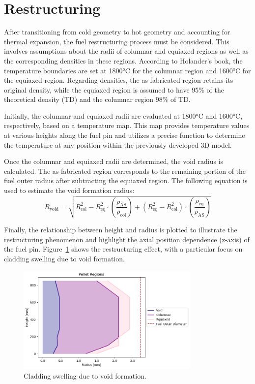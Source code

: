\section{Restructuring}
After transitioning from cold geometry to hot geometry and accounting for thermal expansion, the fuel restructuring process must be considered. This involves assumptions about the radii of columnar and equiaxed regions as well as the corresponding densities in these regions. According to Holander’s book, the temperature boundaries are set at 1800°C for the columnar region and 1600°C for the equiaxed region. Regarding densities, the as-fabricated region retains its original density, while the equiaxed region is assumed to have 95\% of the theoretical density (TD) and the columnar region 98\% of TD.

Initially, the columnar and equiaxed radii are evaluated at 1800°C and 1600°C, respectively, based on a temperature map. This map provides temperature values at various heights along the fuel pin and utilizes a precise function to determine the temperature at any position within the previously developed 3D model.

Once the columnar and equiaxed radii are determined, the void radius is calculated. The as-fabricated region corresponds to the remaining portion of the fuel outer radius after subtracting the equiaxed region. The following equation is used to estimate the void formation radius:
\begin{equation}
R_{\text{void}} = \sqrt{
    R_{\text{col}}^2 - R_{\text{eq}}^2 \cdot \left( \frac{\rho_{\text{AS}}}{\rho_{\text{col}}} \right)
    + \left( R_{\text{eq}}^2 - R_{\text{col}}^2 \right) \cdot \left( \frac{\rho_{\text{eq}}}{\rho_{\text{AS}}} \right)
}
\end{equation}

Finally, the relationship between height and radius is plotted to illustrate the restructuring phenomenon and highlight the axial position dependence (z-axis) of the fuel pin. Figure~\ref{fig:restructuring} shows the restructuring effect, with a particular focus on cladding swelling due to void formation.

\begin{figure}[H]
\centering
\includegraphics[width=0.8\textwidth]{restructuring.png}
\caption{Cladding swelling due to void formation.}
\label{fig:restructuring}
\end{figure}
